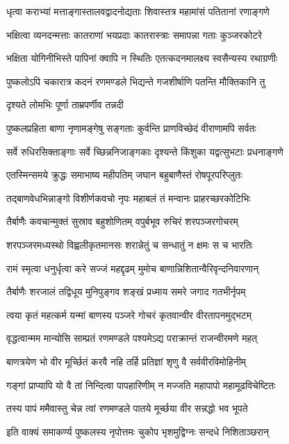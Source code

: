 \twolineshloka
{धृत्वा कराभ्यां मत्ताङ्गास्तालवद्वादनोद्यताः}
{शिवास्तत्र महामांसं पतितानां रणाङ्गणे}%

\twolineshloka
{भक्षित्वा व्यनदन्मत्ताः कातराणां भयप्रदाः}
{कातरास्त्राः समापन्ना गताः कुञ्जरकोटरे}%

\twolineshloka
{भक्षिता योगिनीभिस्ते पापिनां क्वापि न स्थितिः}
{एतत्कदनमालक्ष्य स्वसैन्यस्य रथाग्रणीः}%

\twolineshloka
{पुष्कलोऽपि चकारात्र कदनं रणमण्डले}
{भिद्यन्ते गजशीर्षाणि पतन्ति मौक्तिकानि तु}%

दृश्यते लोमभिः पूर्णा ताम्रपर्णीव तन्नदी

\twolineshloka
{पुष्कलप्रहिता बाणा नृणामङ्गेषु सङ्गताः}
{कुर्वन्ति प्राणविच्छेदं वीराणामपि सर्वतः}%

\twolineshloka
{सर्वे रुधिरसिक्ताङ्गाः सर्वे च्छिन्ननिजाङ्गकाः}
{दृश्यन्ते किंशुका यद्वत्सुभटाः प्रधनाङ्गणे}%

\twolineshloka
{एतस्मिन्समये क्रुद्धः समाभाष्य महीपतिम्}
{जघान बहुबाणैस्तं रोषपूरपरिप्लुतः}%

\twolineshloka
{तद्बाणवेधभिन्नाङ्गो विशीर्णकवचो नृपः}
{महाबलं तं मन्वानः प्राहरच्छरकोटिभिः}%

\twolineshloka
{तैर्बाणैः कवचान्मुक्तं सुस्राव बहुशोणितम्}
{वपुर्बभूव रुचिरं शरपञ्जरगोचरम्}%

\twolineshloka
{शरपञ्जरमध्यस्थो विह्वलीकृतमानसः}
{शरान्नेतुं च सन्धातुं न क्षमः स च भारतिः}%

\twolineshloka
{रामं स्मृत्वा धनुर्धृत्वा करे सज्जं महद्दृढम्}
{मुमोच बाणान्निशितान्वैरिवृन्दनिवारणान्}%

\twolineshloka
{तैर्बाणैः शरजालं तद्विधूय मुनिपुङ्गव}
{शङ्खं प्रध्माय समरे जगाद गतभीर्नृपम्}%


\twolineshloka
{त्वया कृतं महत्कर्म यन्मां बाणस्य पञ्जरे}
{गोचरं कृतवान्वीर वीरतापनमुद्भटम्}%

\twolineshloka
{वृद्धत्वान्मम मान्योसि साम्प्रतं रणमण्डले}
{पश्यमेऽद्य पराक्रान्तं राजन्वीरमणे महत्}%

\twolineshloka
{बाणत्रयेण भो वीर मूर्च्छितं करवै नहि}
{तर्हि प्रतिज्ञां शृणु वै सर्ववीरविमोहिनीम्}%

\twolineshloka
{गङ्गां प्राप्यापि यो वै तां निन्दित्वा पापहारिणीम्}
{न मज्जति महापापो महामूढविचेष्टितः}%

\twolineshloka
{तस्य पापं ममैवास्तु चेन्न त्वां रणमण्डले}
{पातये मूर्च्छया वीर सन्नद्धो भव भूपते}%

\twolineshloka
{इति वाक्यं समाकर्ण्य पुष्कलस्य नृपोत्तमः}
{चुकोप भृशमुद्विग्नः सन्दधे निशिताञ्छरान्}%


